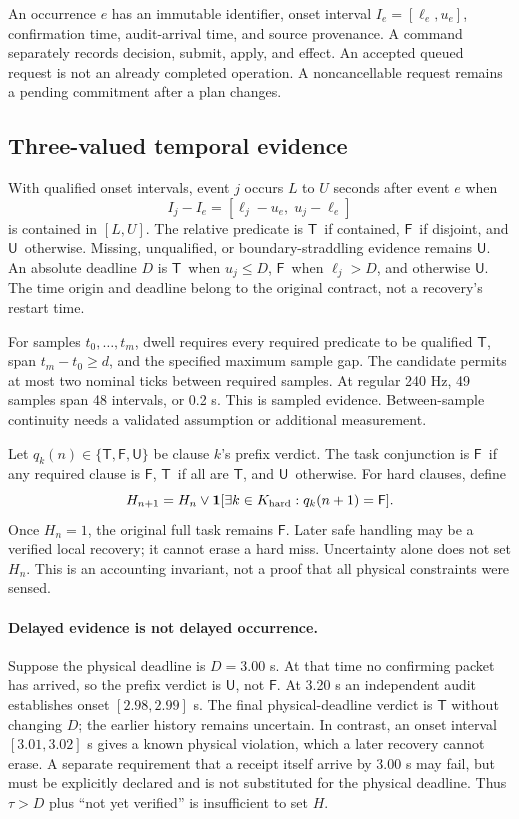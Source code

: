 \documentclass{article}
\newcommand{\True}{\ensuremath{\mathsf{T}}}
\newcommand{\False}{\ensuremath{\mathsf{F}}}
\newcommand{\Unk}{\ensuremath{\mathsf{U}}}
\begin{document}
An occurrence \(e\) has an immutable identifier, onset interval \(I_e=[\ell_e,u_e]\), confirmation time, audit-arrival time, and source provenance. A command separately records decision, submit, apply, and effect. An accepted queued request is not an already completed operation. A noncancellable request remains a pending commitment after a plan changes.

\subsection{Three-valued temporal evidence}
With qualified onset intervals, event \(j\) occurs \(L\) to \(U\) seconds after event \(e\) when
\begin{equation}
I_j-I_e=[\ell_j-u_e,\;u_j-\ell_e]
\label{eq:interval}
\end{equation}
is contained in \([L,U]\). The relative predicate is \True\ if contained, \False\ if disjoint, and \Unk\ otherwise. Missing, unqualified, or boundary-straddling evidence remains \Unk. An absolute deadline \(D\) is \True\ when \(u_j\le D\), \False\ when \(\ell_j>D\), and otherwise \Unk. The time origin and deadline belong to the original contract, not a recovery's restart time.

For samples \(t_0,\ldots,t_m\), dwell requires every required predicate to be qualified \True, span \(t_m-t_0\ge d\), and the specified maximum sample gap. The candidate permits at most two nominal ticks between required samples. At regular 240 Hz, 49 samples span 48 intervals, or 0.2 s. This is sampled evidence. Between-sample continuity needs a validated assumption or additional measurement.

Let \(q_k(n)\in\{\True,\False,\Unk\}\) be clause \(k\)'s prefix verdict. The task conjunction is \False\ if any required clause is \False, \True\ if all are \True, and \Unk\ otherwise. For hard clauses, define
\begin{equation}
H_{n+1}=H_n\lor\mathbf{1}[\exists k\in K_{\rm hard}:q_k(n+1)=\False].
\label{eq:failure}
\end{equation}
Once \(H_n=1\), the original full task remains \False. Later safe handling may be a verified local recovery; it cannot erase a hard miss. Uncertainty alone does not set \(H_n\). This is an accounting invariant, not a proof that all physical constraints were sensed.

\paragraph{Delayed evidence is not delayed occurrence.}
Suppose the physical deadline is $D=3.00$ s. At that time no confirming packet has arrived, so the prefix verdict is $\Unk$, not $\False$. At 3.20 s an independent audit establishes onset $[2.98,2.99]$ s. The final physical-deadline verdict is $\True$ without changing $D$; the earlier history remains uncertain. In contrast, an onset interval $[3.01,3.02]$ s gives a known physical violation, which a later recovery cannot erase. A separate requirement that a receipt itself arrive by 3.00 s may fail, but must be explicitly declared and is not substituted for the physical deadline. Thus $\tau>D$ plus ``not yet verified'' is insufficient to set $H$.
\end{document}
